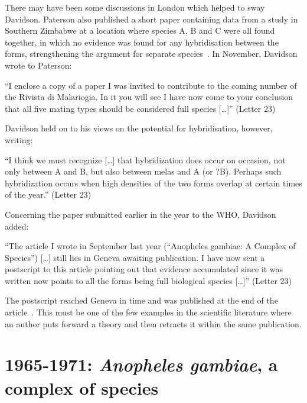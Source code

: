 \documentclass[a4paper,11pt,abstracton,hidelinks]{scrartcl}
\begin{document}
There may have been some discussions in London which helped to sway Davidson.
%
Paterson also published a short paper containing data from a study in Southern Zimbabwe at a location where species A, B and C were all found together, in which no evidence was found for any hybridisation between the forms, strengthening the argument for separate species~\parencite{Paterson1964}.
%
In November, Davidson wrote to Paterson:


\begin{displayquote}
``I enclose a copy of a paper I was invited to contribute to the coming number of the Rivista di Malariogia. In it you will see I have now come to your conclusion that all five mating types should be considered full species [\ldots]'' (Letter 23)
\end{displayquote}


Davidson held on to his views on the potential for hybridisation, however, writing:


\begin{displayquote}
``I think we must recognize [\ldots] that hybridization does occur on occasion, not only between A and B, but also between melas and A (or ?B). Perhaps such hybridization occurs when high densities of the two forms overlap at certain times of the year.'' (Letter 23)
\end{displayquote}


Concerning the paper submitted earlier in the year to the WHO, Davidson added:


\begin{displayquote}
``The article I wrote in September last year (``Anopheles gambiae: A Complex of Species'') [\ldots] still lies in Geneva awaiting publication. I have now sent a postscript to this article pointing out that evidence accumulated since it was written now points to all the forms being full biological species [\ldots]'' (Letter 23)
\end{displayquote}


The postscript reached Geneva in time and was published at the end of the article~\parencite{Davidson1964}.
%
This must be one of the few examples in the scientific literature where an author puts forward a theory and then retracts it within the same publication.


\section{1965-1971: \textit{Anopheles gambiae}, a complex of species}\label{sec:1965-1971}
\end{document}
